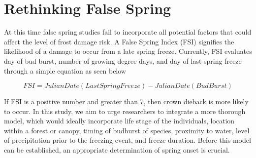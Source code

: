 \documentclass{article}\usepackage[]{graphicx}\usepackage[]{color}
\begin{document}
\section*{Rethinking False Spring}
At this time false spring studies fail to incorporate all potential factors that could affect the level of frost damage risk. A False Spring Index (FSI) signifies the likelihood of a damage to occur from a late spring freeze. Currently, FSI evaluates day of bud burst, number of growing degree days, and day of last spring freeze through a simple equation as seen below %

\[ FSI = Julian Date (Last Spring Freeze) - Julian Date (Bud Burst) \]

If FSI is a positive number and greater than 7, then crown dieback is more likely to occur. In this study, we aim to urge researchers to integrate a more thorough model, which would ideally incorporate life stage of the individuals, location within a forest or canopy, timing of budburst of species, proximity to water, level of precipitation prior to the freezing event, and freeze duration. Before this model can be established, an appropriate determination of spring onset is crucial. 
\end{document}
